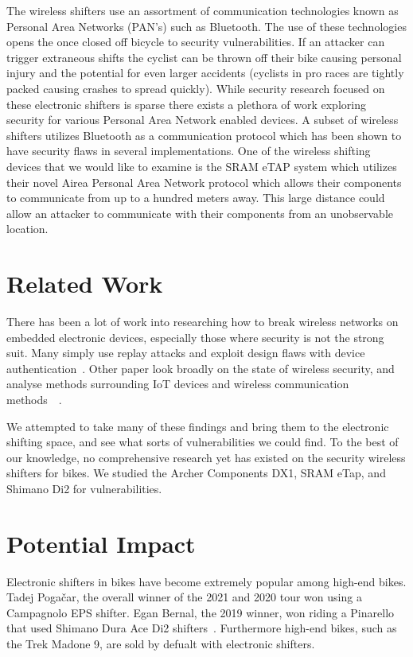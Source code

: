 \documentclass[letterpaper,twocolumn,10pt]{article}
\begin{document}
The wireless shifters use an assortment of communication technologies known as Personal Area Networks (PAN’s) such as Bluetooth. The use of these technologies opens the once closed off bicycle to security vulnerabilities. If an attacker can trigger extraneous shifts the cyclist can be thrown off their bike causing personal injury and the potential for even larger accidents (cyclists in pro races are tightly packed causing crashes to spread quickly). While security research focused on these electronic shifters is sparse there exists a plethora of work exploring security for various Personal Area Network enabled devices. A subset of wireless shifters utilizes Bluetooth as a communication protocol which has been shown to have security flaws in several implementations. One of the wireless shifting devices that we would like to examine is the SRAM eTAP system which utilizes their novel Airea Personal Area Network protocol which allows their components to communicate from up to a hundred meters away. This large distance could allow an attacker to communicate with their components from an unobservable location.

\section{Related Work}

There has been a lot of work into researching how to break wireless networks on embedded electronic devices, especially those where security is not the strong suit. Many simply use replay attacks and exploit design flaws with device authentication~\cite{Halperin}. Other paper look broadly on the state of wireless security, and analyse methods surrounding IoT devices and wireless communication methods~\cite{Choi}~\cite{Radek}.

We attempted to take many of these findings and bring them to the electronic shifting space, and see what sorts of vulnerabilities we could find. To the best of our knowledge, no comprehensive research yet has existed on the security wireless shifters for bikes. We studied the Archer Components DX1, SRAM eTap, and Shimano Di2 for vulnerabilities.

\section{Potential Impact}

Electronic shifters in bikes have become extremely popular among high-end bikes. Tadej Pogačar, the overall winner of the 2021 and 2020 tour won using a Campagnolo EPS shifter. Egan Bernal, the 2019 winner, won riding a Pinarello that used Shimano Dura Ace Di2 shifters~\cite{GCNTech}. Furthermore high-end bikes, such as the Trek Madone 9, are sold by defualt with electronic shifters.
\end{document}
